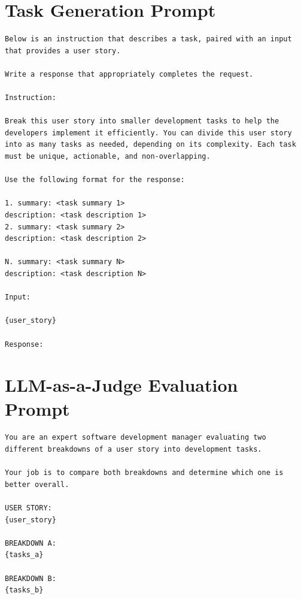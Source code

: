 \documentclass[pdflatex,sn-mathphys-num]{sn-jnl}
\theoremstyle{thmstyleone}%
\theoremstyle{thmstyletwo}%
\theoremstyle{thmstylethree}%
\begin{document}
\begin{appendices}

\section{Task Generation Prompt}
\label{appendix:task_generation_prompt}

\begin{lstlisting}[basicstyle=\ttfamily\small, breaklines=true, caption={Prompt for Task Generation}, label={lst:task_generation_prompt}]
Below is an instruction that describes a task, paired with an input that provides a user story.

Write a response that appropriately completes the request.

Instruction:

Break this user story into smaller development tasks to help the developers implement it efficiently. You can divide this user story into as many tasks as needed, depending on its complexity. Each task must be unique, actionable, and non-overlapping.

Use the following format for the response:

1. summary: <task summary 1>
description: <task description 1>
2. summary: <task summary 2>
description: <task description 2>

N. summary: <task summary N>
description: <task description N>

Input:

{user_story}

Response:
\end{lstlisting}

\section{LLM-as-a-Judge Evaluation Prompt}
\label{appendix:llm_judge_prompt}

\begin{lstlisting}[basicstyle=\ttfamily\small, breaklines=true, caption={LLM-as-a-Judge Prompt}, label={lst:llm_judge_prompt}]
You are an expert software development manager evaluating two different breakdowns of a user story into development tasks.

Your job is to compare both breakdowns and determine which one is better overall.

USER STORY:
{user_story}

BREAKDOWN A:
{tasks_a}

BREAKDOWN B:
{tasks_b}


\end{lstlisting}
\end{appendices}
\end{document}
